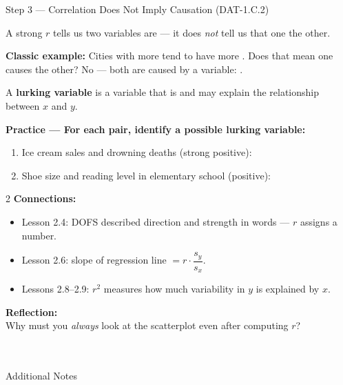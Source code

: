 \documentclass[10pt]{article}
\begin{document}
\begin{notesbox}{Step 3 --- Correlation Does Not Imply Causation (DAT-1.C.2)}
\small

\noindent A strong $r$ tells us two variables are  --- it does \emph{not} tell
us that one  the other.

\vspace{6pt}
\textbf{Classic example:} Cities with more  tend to have more .
Does that mean one causes the other? No --- both are caused by a  variable: .

\vspace{6pt}
A \textbf{lurking variable} is a variable that is  and may explain the
relationship between $x$ and $y$.

\vspace{6pt}
\textbf{Practice --- For each pair, identify a possible lurking variable:}
\begin{enumerate}[leftmargin=1.5em, itemsep=4pt]
  \item Ice cream sales and drowning deaths (strong positive): 
  \item Shoe size and reading level in elementary school (positive): 
\end{enumerate}
\end{notesbox}

\vspace{0.08in}

\begin{spiralbox}
\small
\begin{multicols}{2}
\textbf{Connections:}
\begin{itemize}[itemsep=3pt]
  \item Lesson 2.4: DOFS described direction and strength in words --- $r$ assigns a number.
  \item Lesson 2.6: slope of regression line $= r \cdot \dfrac{s_y}{s_x}$.
  \item Lessons 2.8--2.9: $r^2$ measures how much variability in $y$ is explained by $x$.
\end{itemize}

\columnbreak

\textbf{Reflection:}\\
Why must you \emph{always} look at the scatterplot even after computing $r$?\\[2pt]
\\[1pt]
\\[1pt]
\end{multicols}
\end{spiralbox}

\vspace{0.08in}

\begin{notesbox}{Additional Notes}
\vspace{0pt}
\writeline\\\writeline\\\writeline\\\writeline\\\writeline
\end{notesbox}
\end{document}
